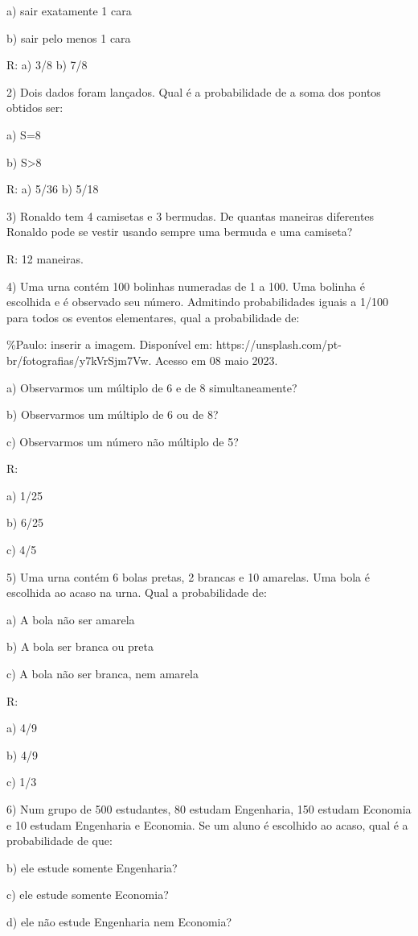 a) sair exatamente 1 cara

b) sair pelo menos 1 cara

R: a) 3/8 b) 7/8

2) Dois dados foram lançados. Qual é a probabilidade de a soma dos
pontos obtidos ser:

a) S=8

b) S\textgreater8

R: a) 5/36 b) 5/18

3) Ronaldo tem 4 camisetas e 3 bermudas. De quantas maneiras diferentes
Ronaldo pode se vestir usando sempre uma bermuda e uma camiseta?

R: 12 maneiras.

4) Uma urna contém 100 bolinhas numeradas de 1 a 100. Uma bolinha é
escolhida e é observado seu número. Admitindo probabilidades iguais a
1/100 para todos os eventos elementares, qual a probabilidade de:

\%Paulo: inserir a imagem. Disponível em:
https://unsplash.com/pt-br/fotografias/y7kVrSjm7Vw. Acesso em 08 maio
2023.

a) Observarmos um múltiplo de 6 e de 8 simultaneamente?

b) Observarmos um múltiplo de 6 ou de 8?

c) Observarmos um número não múltiplo de 5?

R:

a) 1/25

b) 6/25

c) 4/5

5) Uma urna contém 6 bolas pretas, 2 brancas e 10 amarelas. Uma bola é
escolhida ao acaso na urna. Qual a probabilidade de:

a) A bola não ser amarela

b) A bola ser branca ou preta

c) A bola não ser branca, nem amarela

R:

a) 4/9

b) 4/9

c) 1/3

6) Num grupo de 500 estudantes, 80 estudam Engenharia, 150 estudam
Economia e 10 estudam Engenharia e Economia. Se um aluno é escolhido ao
acaso, qual é a probabilidade de que:

b) ele estude somente Engenharia?

c) ele estude somente Economia?

d) ele não estude Engenharia nem Economia?

